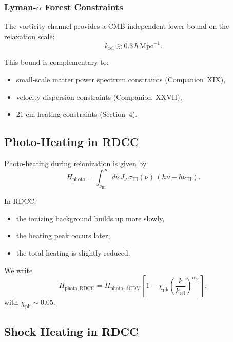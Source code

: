 \documentclass[11pt,a4paper]{article}
\begin{document}
\subsubsection[Lyman-alpha Forest Constraints]
{Lyman-$\alpha$ Forest Constraints}

The vorticity channel provides a CMB-independent lower bound on the relaxation scale:
\begin{equation}
k_{\mathrm{rel}}
\gtrsim
0.3\,h\,\mathrm{Mpc}^{-1}.
\end{equation}

This bound is complementary to:
\begin{itemize}
\item small-scale matter power spectrum constraints (Companion~XIX),
\item velocity-dispersion constraints (Companion~XXVII),
\item 21-cm heating constraints (Section~4).
\end{itemize}

\subsection{Photo-Heating in RDCC}

Photo-heating during reionization is given by
\begin{equation}
H_{\mathrm{photo}}
=
\int_{\nu_{\mathrm{HI}}}^{\infty}
d\nu\,
J_{\nu}\,
\sigma_{\mathrm{HI}}(\nu)\,
(h\nu - h\nu_{\mathrm{HI}}).
\end{equation}

In RDCC:
\begin{itemize}
\item the ionizing background builds up more slowly,
\item the heating peak occurs later,
\item the total heating is slightly reduced.
\end{itemize}

We write
\begin{equation}
H_{\mathrm{photo,RDCC}}
=
H_{\mathrm{photo},\Lambda\mathrm{CDM}}
\left[
1
-
\chi_{\mathrm{ph}}
\left(
\frac{k}{k_{\mathrm{rel}}}
\right)^{\alpha_{\mathrm{ph}}}
\right],
\end{equation}
with $\chi_{\mathrm{ph}} \sim 0.05$.

\subsection{Shock Heating in RDCC}
\end{document}
